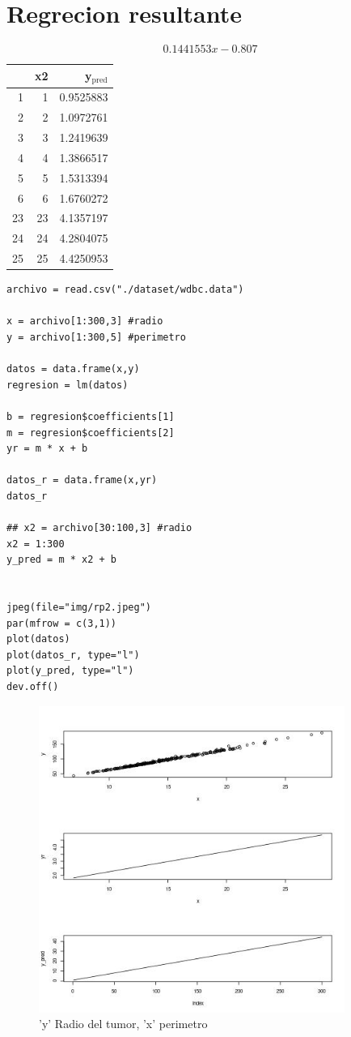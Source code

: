 \documentclass[12pt]{article}
\begin{document}
\section*{Regrecion resultante}
\label{sec:orgfc89c82}
\[ 0.1441553 x - 0.807 \]

\begin{center}
\begin{tabular}{rrr}
 & x2 & y\(_{\text{pred}}\)\\
\hline
1 & 1 & 0.9525883\\
2 & 2 & 1.0972761\\
3 & 3 & 1.2419639\\
4 & 4 & 1.3866517\\
5 & 5 & 1.5313394\\
6 & 6 & 1.6760272\\
23 & 23 & 4.1357197\\
24 & 24 & 4.2804075\\
25 & 25 & 4.4250953\\
\end{tabular}
\end{center}

\begin{verbatim}
archivo = read.csv("./dataset/wdbc.data")

x = archivo[1:300,3] #radio
y = archivo[1:300,5] #perimetro

datos = data.frame(x,y)
regresion = lm(datos)

b = regresion$coefficients[1]
m = regresion$coefficients[2]
yr = m * x + b

datos_r = data.frame(x,yr)
datos_r

## x2 = archivo[30:100,3] #radio
x2 = 1:300
y_pred = m * x2 + b


jpeg(file="img/rp2.jpeg")
par(mfrow = c(3,1))
plot(datos)
plot(datos_r, type="l")
plot(y_pred, type="l")
dev.off()
\end{verbatim}

\begin{figure}[htbp]
\centering
\includegraphics[width=10cm]{img/rp2.jpeg}
\caption{'y' Radio del tumor, 'x' perimetro}
\end{figure}
\end{document}
